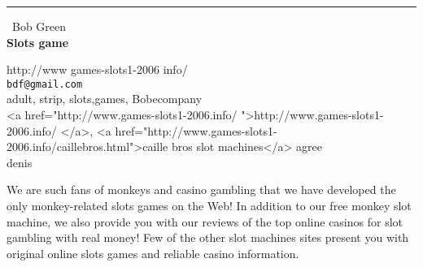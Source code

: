 \documentclass{report}
\begin{document}
\begin{center}
\rule{6in}{1pt} \
{\large Bob Green \\
{\bf Slots game}}

http://www games-slots1-2006 info/
\\
{\tt bdf@gmail.com}\\
adult, strip, slots,games, Bobecompany\\
<a href="http://www.games-slots1-2006.info/ ">http://www.games-slots1-2006.info/ </a>, <a href="http://www.games-slots1-2006.info/caillebros.html">caille bros slot machines</a> agree\\
	denis\end{center}

We are such fans of monkeys and casino gambling that we have developed
the only monkey-related slots games on the Web! In addition to our free
monkey slot machine, we also provide you with our reviews of the top
online casinos for slot gambling with real money! Few of the other slot
machines sites present you with original online slots games and reliable
casino information.
\end{document}

